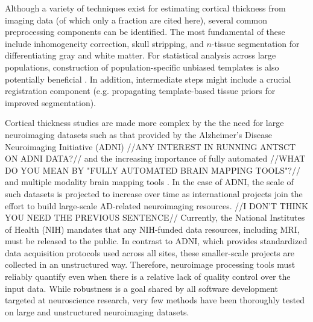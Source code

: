 Although a variety of techniques exist for estimating cortical thickness
from imaging data (of which only a fraction are cited here), several common preprocessing components
can be identified.  The most fundamental of these include inhomogeneity correction, skull stripping, and $n$-tissue segmentation for differentiating gray and white matter.  For statistical analysis
across large populations, construction of population-specific unbiased templates
is also potentially beneficial \citep{evans2012}.
In addition, intermediate steps might include a crucial registration component (e.g. 
propagating template-based tissue priors for improved segmentation).

Cortical thickness studies are made more complex by the
the need for large neuroimaging datasets such as that provided by the Alzheimer's
Disease Neuroimaging Initiative (ADNI) //ANY INTEREST IN RUNNING ANTSCT ON ADNI DATA?// and the increasing importance
of fully automated //WHAT DO YOU MEAN BY "FULLY AUTOMATED BRAIN MAPPING TOOLS"?//
and multiple modality brain mapping tools
\citep{Weiner2012}.  In the case of ADNI, the scale of such datasets is projected
to increase over time as international projects join the effort to build
large-scale AD-related neuroimaging resources. //I DON'T THINK YOU NEED THE PREVIOUS SENTENCE//
Currently, the National Institutes of Health (NIH) mandates that any NIH-funded data
resources, including MRI, must be released to the public.  In contrast
to ADNI, which provides standardized data acquisition protocols used
across all sites, these smaller-scale projects are collected in an
unstructured way.  Therefore, neuroimage processing tools must
reliably quantify even when there is a relative lack of quality
control over the input data.  While robustness is a goal shared by all
software development targeted at neuroscience research, very few methods have
been thoroughly tested on large and unstructured neuroimaging datasets.



